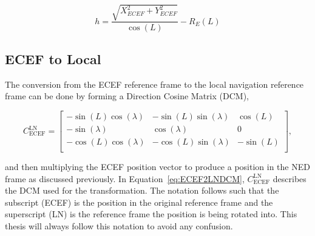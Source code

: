 \begin{equation}\label{eq:ecef2llaaltitude}
    h = \frac{\sqrt{X_{ECEF}^2 + Y^2_{ECEF}}}{\cos\left(L\right)} - R_E (L)
\end{equation}


\subsection{ECEF to Local}
The conversion from the ECEF reference frame to the local navigation reference frame can be done by forming a Direction Cosine Matrix (DCM),

\begin{equation}\label{eq:ECEF2LNDCM}
    C^{\textrm{LN}}_{\textrm{ECEF}} =
    \begin{bmatrix}
        -\sin\left(L\right)\cos\left(\lambda\right) & -\sin\left(L\right)\sin\left(\lambda\right) & \cos\left(L\right)  \\
        -\sin\left(\lambda\right)                   & \cos\left(\lambda\right)                    & 0                   \\
        -\cos\left(L\right)\cos\left(\lambda\right) & -\cos\left(L\right)\sin\left(\lambda\right) & -\sin\left(L\right) \\
    \end{bmatrix},
\end{equation}

and then multiplying the ECEF position vector to produce a position in the NED frame as discussed previously. In Equation~\ref{eq:ECEF2LNDCM}, \(C^{\textrm{LN}}_{\textrm{ECEF}}\) describes the DCM used for the transformation. The notation follows such that the subscript (ECEF) is the position in the original reference frame and the superscript (LN) is the reference frame the position is being rotated into. This thesis will always follow this notation to avoid any confusion.

